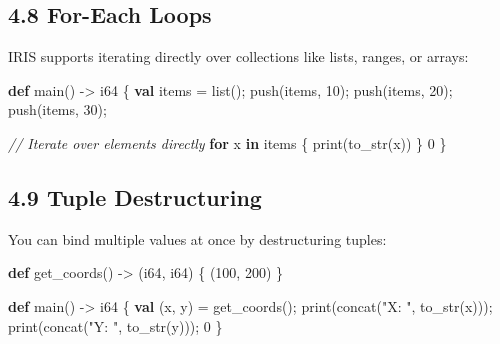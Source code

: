 \documentclass[
  english,
]{book}
\newenvironment{Shaded}{\begin{snugshade}}{\end{snugshade}}
\newcommand{\CommentTok}[1]{\textcolor[rgb]{0.42,0.60,0.33}{\textit{#1}}}
\newcommand{\ControlFlowTok}[1]{\textcolor[rgb]{0.77,0.53,0.75}{\textbf{#1}}}
\newcommand{\DataTypeTok}[1]{\textcolor[rgb]{0.31,0.79,0.69}{#1}}
\newcommand{\DecValTok}[1]{\textcolor[rgb]{0.71,0.81,0.66}{#1}}
\newcommand{\FunctionTok}[1]{\textcolor[rgb]{0.86,0.86,0.67}{#1}}
\newcommand{\KeywordTok}[1]{\textcolor[rgb]{0.34,0.61,0.84}{\textbf{#1}}}
\newcommand{\NormalTok}[1]{\textcolor[rgb]{0.83,0.83,0.83}{#1}}
\newcommand{\OperatorTok}[1]{\textcolor[rgb]{0.83,0.83,0.83}{#1}}
\newcommand{\StringTok}[1]{\textcolor[rgb]{0.81,0.57,0.47}{#1}}
\begin{document}
\subsection{4.8 For-Each Loops}\label{for-each-loops-1}

IRIS supports iterating directly over collections like lists, ranges, or
arrays:

\begin{Shaded}
\begin{Highlighting}[]
\KeywordTok{def}\NormalTok{ main() }\OperatorTok{{-}\textgreater{}} \DataTypeTok{i64}\NormalTok{ \{}
    \KeywordTok{val}\NormalTok{ items }\OperatorTok{=} \DataTypeTok{list}\NormalTok{();}
    \FunctionTok{push}\NormalTok{(items, }\DecValTok{10}\NormalTok{); }\FunctionTok{push}\NormalTok{(items, }\DecValTok{20}\NormalTok{); }\FunctionTok{push}\NormalTok{(items, }\DecValTok{30}\NormalTok{);}
    
    \CommentTok{// Iterate over elements directly}
    \ControlFlowTok{for}\NormalTok{ x }\ControlFlowTok{in}\NormalTok{ items \{}
        \FunctionTok{print}\NormalTok{(}\FunctionTok{to\_str}\NormalTok{(x))}
\NormalTok{    \}}
    \DecValTok{0}
\NormalTok{\}}
\end{Highlighting}
\end{Shaded}

\subsection{4.9 Tuple Destructuring}\label{tuple-destructuring-1}

You can bind multiple values at once by destructuring tuples:

\begin{Shaded}
\begin{Highlighting}[]
\KeywordTok{def}\NormalTok{ get\_coords() }\OperatorTok{{-}\textgreater{}}\NormalTok{ (}\DataTypeTok{i64}\NormalTok{, }\DataTypeTok{i64}\NormalTok{) \{}
\NormalTok{    (}\DecValTok{100}\NormalTok{, }\DecValTok{200}\NormalTok{)}
\NormalTok{\}}

\KeywordTok{def}\NormalTok{ main() }\OperatorTok{{-}\textgreater{}} \DataTypeTok{i64}\NormalTok{ \{}
    \KeywordTok{val}\NormalTok{ (x, y) }\OperatorTok{=}\NormalTok{ get\_coords();}
    \FunctionTok{print}\NormalTok{(}\FunctionTok{concat}\NormalTok{(}\StringTok{"X: "}\NormalTok{, }\FunctionTok{to\_str}\NormalTok{(x)));}
    \FunctionTok{print}\NormalTok{(}\FunctionTok{concat}\NormalTok{(}\StringTok{"Y: "}\NormalTok{, }\FunctionTok{to\_str}\NormalTok{(y)));}
    \DecValTok{0}
\NormalTok{\}}
\end{Highlighting}
\end{Shaded}
\end{document}
